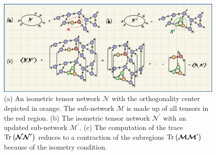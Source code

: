 \begin{figure}
	\centering
	\includegraphics[width=\textwidth]{figures/Tensor_Networks/isometric_tensor_network_local_approximation.jpeg}
	\caption{(a) An isometric tensor network $\bm{\mathcal{N}}$ with the orthogonality center depicted in orange. The sub-network $\bm{\mathcal{M}}$ is made up of all tensors in the red region. (b) The isometric tensor network $\bm{\mathcal{N}}^\prime$ with an updated sub-network $\bm{\mathcal{M}}^\prime$. (c) The computation of the trace $\operatorname{Tr}\left(\bm{\mathcal{N}}\bm{\mathcal{N}}^\prime\right)$ reduces to a contraction of the subregions $\operatorname{Tr}\left(\bm{\mathcal{M}}\bm{\mathcal{M}}^\prime\right)$ because of the isometry condition.}
	\label{fig:isometric_tensor_network_local_approximation}
\end{figure}